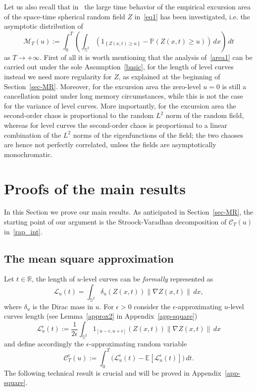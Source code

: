 \documentclass[AHL,Unicode,longabstracts,published]{cedram}
\newcommand{\clC}{\mathcal{C}}
\newcommand{\clL}{\mathcal{L}}
\newcommand{\bbS}{\mathbb{S}}
\newcommand{\bbR}{\mathbb{R}}
\newcommand{\bbP}{\mathbb{P}}
\newcommand{\bbE}{\mathbb{E}}
\begin{document}
Let us also recall that in~\cite{MRV:20} the large time behavior of the empirical excursion area of the space-time spherical random field $Z$ in~\eqref{eq1} has been investigated, i.e. the asymptotic distribution of
\begin{equation}\label{area1}
\mathcal{M}_T(u) := \int_0^T \left (\int_{\bbS^2}\left(1_{\left\{ Z(x,t)\ge u\right\}} - \bbP(Z(x,t)\ge u)\right)\,dx\right)\,dt
\end{equation}
as $T\to +\infty$. First of all it is worth mentioning that the analysis of~\eqref{area1} can be carried out under the sole Assumption~\ref{basic}, for the length of level curves instead we need more regularity for $Z$, as explained at the beginning of Section~\ref{sec-MR}. Moreover, for the excursion area the zero-level $u=0$ is still a cancellation point under long memory circumstances, while this is not the case for the variance of level curves. More importantly, for the excursion area the second-order chaos is proportional to the random $L^2$ norm of the random field, whereas for level curves the second-order chaos is proportional to a linear combination of the $L^2$ norms of the eigenfunctions of the field; the two chaoses are hence not perfectly correlated, unless the fields are asymptotically monochromatic.

\section{Proofs of the main results}
\label{secProofsMR}

In this Section we prove our main results. As anticipated in Section~\ref {sec-MR}, the starting point of our argument is the Stroock-Varadhan decomposition of $\clC_T(u)$ in~\eqref{rap_int}.

\subsection{The mean square approximation}\label{sect4.1}

Let $t\in \bbR$, the length of $u$-level curves can be \emph{formally} represented as
\begin{equation*}
\clL_u(t) = \int_{\bbS^2} \delta_u(Z(x,t)) \| \nabla Z(x,t)\|\,dx,
\end{equation*}
where $\delta_u$ is the Dirac mass in $u$. For $\epsilon >0$ consider the $
\epsilon$-approximating $u$-level curves length (see Lemma~\ref{approx2} in Appendix~\ref{app-square})
\begin{equation}\label{Leps}
\clL_u^\epsilon(t) := \frac{1}{2\epsilon}\int_{\bbS^2} 1_{\left[u-\epsilon,u+ \epsilon\right]}(Z(x,t)) \| \nabla Z(x,t)\|\,dx
\end{equation}
and define accordingly the $\epsilon$-approximating random variable
\begin{equation}\label{Ceps}
\clC^\epsilon_T(u) := \int_0^T \big(\clL_u^\epsilon(t) -
\bbE\left[\clL_u^\epsilon(t)\right]\big)\,dt.
\end{equation}
The following technical result is crucial and will be proved in Appendix~\ref {app-square}.
\end{document}
